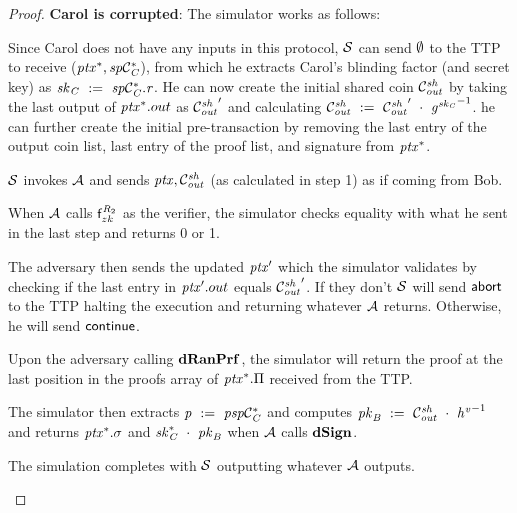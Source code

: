 \begin{proof}
    \textbf{Carol is corrupted}: The simulator works as follows:
    \begin{asparaenum}
        \item Since Carol does not have any inputs in this protocol, $\mathcal{S}$ can send $\emptyset$ to the TTP to receive ($\mathit{ptx}^*, \mathit{sp}\mathcal{C}_{\mathit{C}}^*$), from which he extracts Carol's blinding factor (and secret key) as $\mathit{sk}_{\mathit{C}} ~:=~ \mathit{sp}\mathcal{C}_{\mathit{C}}^*.\mathit{r}$.
        He can now create the initial shared coin $\mathcal{C}_{\mathit{out}}^{\mathit{sh}}$ by taking the last output of $\mathit{ptx}^*.out$ as ${\mathcal{C}_{\mathit{out}}^{\mathit{sh}}}'$ and calculating $\mathcal{C}_{\mathit{out}}^{\mathit{sh}} ~:=~ {\mathcal{C}_{\mathit{out}}^{\mathit{sh}}}' ~\cdot~ {\mathit{g}^{\mathit{sk}_{\mathit{C}}}}^{-1}$.
        he can further create the initial pre-transaction by removing the last entry of the output coin list, last entry of the proof list, and signature from $\mathit{ptx}^*$.
        \item $\mathcal{S}$ invokes $\mathcal{A}$ and sends $\mathit{ptx}, \mathcal{C}_{\mathit{out}}^{\mathit{sh}}$ (as calculated in step 1) as if coming from Bob.
        \item When $\mathcal{A}$ calls $\mathsf{f}^{\mathit{R}_2}_{zk}$ as the verifier, the simulator checks equality with what he sent in the last step and returns 0 or 1.
        \item The adversary then sends the updated ${\mathit{ptx}}'$ which the simulator validates by checking if the last entry in ${\mathit{ptx}}'.out$ equals ${\mathcal{C}_{\mathit{out}}^{\mathit{sh}}}'$.
        If they don't $\mathcal{S}$ will send $\mathsf{abort}$ to the TTP halting the execution and returning whatever $\mathcal{A}$ returns.
        Otherwise, he will send $\mathsf{continue}$.
        \item Upon the adversary calling $\mathbf{dRanPrf}$, the simulator will return the proof at the last position in the proofs array of $\mathit{ptx}^*.\Pi$ received from the TTP.
        \item The simulator then extracts $\mathit{p} ~:=~ \mathit{psp}\mathcal{C}_{\mathit{C}}^*$ and computes $\mathit{pk}_{\mathit{B}} ~:=~ \mathcal{C}_{\mathit{out}}^{\mathit{sh}} ~\cdot~ {\mathit{h}^{\mathit{v}}}^{-1}$ and returns $\mathit{ptx}^*.\sigma$ and $\mathit{sk}_{\mathit{C}}^* ~\cdot~ \mathit{pk}_{\mathit{B}}$ when $\mathcal{A}$ calls $\mathbf{dSign}$.
        \item The simulation completes with $\mathcal{S}$ outputting whatever $\mathcal{A}$ outputs.
    \end{asparaenum}


\end{proof}
